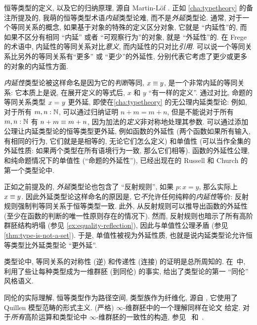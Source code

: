 \sectionNotes

恒等类型的定义, 以及它的归纳原理, 源自 Martin-L\"of \cite{Martin-Lof-1972}.
%
%
%
%
%
正如 \cref{cha:typetheory} 的备注所提及的, 我萌的恒等类型术语\emph{内延}类型论难, 而不是\emph{外延}类型论.
通常, 对于一个等同关系的概念, 如果基于对象的特殊的定义区分对象, 它就是 ``内延性''的, 而如果不区分有相同 ``内延'' 或者 ``可观察行为''的对象, 就是 ``外延性''的.
在 Frege 的术语中, 内延性的等同关系对比\emph{意义}, 而内延性的只对比\emph{引用}.
可以说一个等同关系比另外的等同关系有``更多'' 或 ``更少''的外延性, 分别代表它考虑了更少或更多的对象的内延性方面.

\emph{内延性}类型论被这样命名是因为它的\emph{判断}等同, $x\equiv y$, 是一个非常内延的等同关系: 它本质上是说, 在展开定义的等式后, $x$ 和 $y$ ``有一样的定义''.
通过对比, 命题的等同关系类型 $x =_{} y$ 更外延, 即使在\cref{cha:typetheory} 的无公理内延类型论: 例如, 对于所有 $m,n:\mathbb{N}$, 可以通过归纳证明 $n+m=m+n$, 但是不能说对于所有 $m,n:\mathbb{N}$ 有 $n+m\equiv m+n$, 因为加法的\emph{定义}非对称地处理其参数.
可以通过添加公理让内延类型论的恒等类型更外延, 例如函数的外延性 (两个函数如果所有输入, 有相同的行为, 它们就是是相等的, 无论它们怎么定义) 和单值性 (可以当作全集的外延性质: 如果两个类型在所有语境行为一致, 那么它们相等).
函数的外延性公理, 和纯命题情况下的单值性 (``命题的外延性''), 已经出现在的 Russell 和 Church 的第一个类型论中.

正如之前提及的, \emph{外延}类型论也包含了 ``反射规则'', 如果 $p:x=y$, 那么实际上 $x\equiv y$.
因此外延类型论这样命名的原因是, 它\emph{不}允许任何纯粹的\emph{内延性}等价: 反射规则强制判等同关系于恒等类型一致.
此外, 从反射规则可以推导出函数的外延性 (至少在函数的判断的唯一性原则存在的情况下).
然而, 反射规则也暗示了所有高阶群胚结构坍塌 (参见 \cref{ex:equality-reflection}), 因此与单值性公理矛盾 (参见 \cref{thm:type-is-not-a-set}).
于是, 单值性被视为外延性质, 也就是说内延类型论允许恒等类型比外延类型论 ``更外延''.

类型论中, 等同关系的对称性 (逆) 和传递性 (连接) 的证明是总所周知的.
在~\cite{hs:gpd-typethy}中, 利用了些让每种类型成为一维群胚 (到同伦) 的事实, 给出了类型论的第一 ``同伦'' 风格语义.

同伦的实际理解, 恒等类型作为路径空间, 类型族作为纤维化, 源自 \cite{AW}, 它使用了 Quillen 模型范畴的形式主义.
(严格) $\infty$-维群胚中的一个理解同样在论文 \cite{mw:thesis} 给定.
对于\emph{所有}高阶运算和类型论中 $\infty$-维群胚的一致性的构造, 参见~\cite{pll:wkom-type} 和~\cite{bg:type-wkom}.

